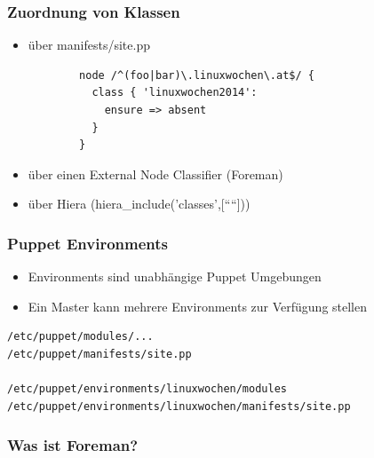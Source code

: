 \documentclass{beamer}
\begin{document}
\begin{frame}[fragile]
  \frametitle{Zuordnung von Klassen}

  \begin{itemize}
    \item über manifests/site.pp
      \begin{lstlisting}
        node /^(foo|bar)\.linuxwochen\.at$/ {
          class { 'linuxwochen2014':
            ensure => absent
          }
        }
      \end{lstlisting}
  \item über einen External Node Classifier (Foreman)
  \item über Hiera (hiera\_include('classes',[````]))
  \end{itemize}
\end{frame}

\begin{frame}[fragile]
  \frametitle{Puppet Environments}
  \begin{itemize}
  \item Environments sind unabhängige Puppet Umgebungen
  \item Ein Master kann mehrere Environments zur Verfügung stellen
  \end{itemize}

\begin{lstlisting}
/etc/puppet/modules/...
/etc/puppet/manifests/site.pp

/etc/puppet/environments/linuxwochen/modules
/etc/puppet/environments/linuxwochen/manifests/site.pp
\end{lstlisting}
\end{frame}

\begin{frame}
  \frametitle{Was ist Foreman?}
  \begin{figure}[ht]
    \centering
    \label{fig:stack}
  \end{figure}
\end{frame}
\end{document}

